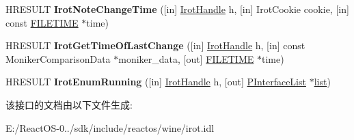 \begin{DoxyCompactItemize}
\item 
\mbox{\label{interface_irot_a00e91029c2b1d2cfa42ebb9e30262eeb}} 
H\+R\+E\+S\+U\+LT {\bfseries Irot\+Note\+Change\+Time} (\mbox{[}in\mbox{]} \hyperlink{interfacevoid}{Irot\+Handle} h, \mbox{[}in\mbox{]} Irot\+Cookie cookie, \mbox{[}in\mbox{]} const \hyperlink{struct___f_i_l_e_t_i_m_e}{F\+I\+L\+E\+T\+I\+ME} $\ast$time)
\item 
\mbox{\label{interface_irot_a6926034c98f20e70ba3e8d604d9ed4db}} 
H\+R\+E\+S\+U\+LT {\bfseries Irot\+Get\+Time\+Of\+Last\+Change} (\mbox{[}in\mbox{]} \hyperlink{interfacevoid}{Irot\+Handle} h, \mbox{[}in\mbox{]} const Moniker\+Comparison\+Data $\ast$moniker\+\_\+data, \mbox{[}out\mbox{]} \hyperlink{struct___f_i_l_e_t_i_m_e}{F\+I\+L\+E\+T\+I\+ME} $\ast$time)
\item 
\mbox{\label{interface_irot_af7a7d9df1bc40ac2a51571da212f90fb}} 
H\+R\+E\+S\+U\+LT {\bfseries Irot\+Enum\+Running} (\mbox{[}in\mbox{]} \hyperlink{interfacevoid}{Irot\+Handle} h, \mbox{[}out\mbox{]} \hyperlink{struct_irot_1_1tag_interface_list}{P\+Interface\+List} $\ast$\hyperlink{classlist}{list})
\end{DoxyCompactItemize}


该接口的文档由以下文件生成\+:\begin{DoxyCompactItemize}
\item 
E\+:/\+React\+O\+S-\/0../sdk/include/reactos/wine/irot.\+idl\end{DoxyCompactItemize}
